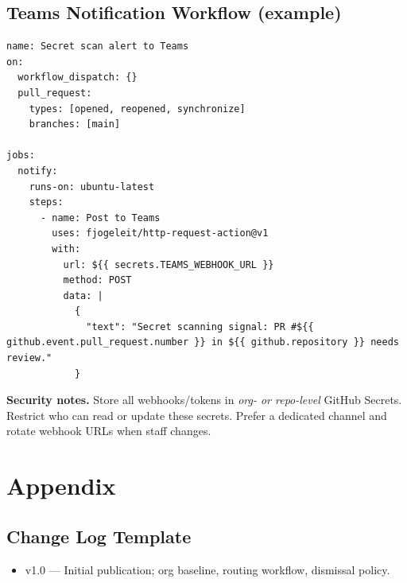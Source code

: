\documentclass[11pt,a4paper,oneside,notitlepage]{article}
\begin{document}
\subsection{Teams Notification Workflow (example)}
\begin{listing}[htbp]
\caption{GitHub Actions workflow: Post signal to Microsoft Teams}
\label{lst:teams-workflow}
\begin{verbatim}
name: Secret scan alert to Teams
on:
  workflow_dispatch: {}
  pull_request:
    types: [opened, reopened, synchronize]
    branches: [main]

jobs:
  notify:
    runs-on: ubuntu-latest
    steps:
      - name: Post to Teams
        uses: fjogeleit/http-request-action@v1
        with:
          url: ${{ secrets.TEAMS_WEBHOOK_URL }}
          method: POST
          data: |
            {
              "text": "Secret scanning signal: PR #${{ github.event.pull_request.number }} in ${{ github.repository }} needs review."
            }
\end{verbatim}
\end{listing}

\begin{tcolorbox}
\textbf{Security notes.} Store all webhooks/tokens in \emph{org- or repo-level} GitHub Secrets. Restrict who can read or update these secrets. Prefer a dedicated channel and rotate webhook URLs when staff changes.
\end{tcolorbox}

\section{Appendix}
\subsection*{Change Log Template}
\begin{itemize}
  \item v1.0 --- Initial publication; org baseline, routing workflow, dismissal policy.
\end{itemize}
\end{document}

